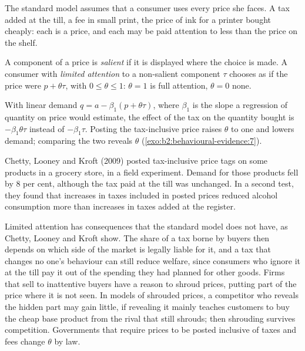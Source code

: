 The standard model assumes that a consumer uses every price she faces. A tax added at the till, a fee
in small print, the price of ink for a printer bought cheaply: each is a price, and each may be paid
attention to less than the price on the shelf.

\begin{definition}[Salience]\label{def:b2:behavioural-evidence:salience}
A component of a price is \emph{salient} if it is displayed where the choice is made.
A consumer with \emph{limited attention} to a non-salient component $\tau$ chooses as if the price were
$p + \theta\tau$, with $0 \le \theta \le 1$: $\theta = 1$ is full attention, $\theta = 0$ none.
\end{definition}

With linear demand $q = a - \beta_1(p + \theta\tau)$, where $\beta_1$ is the slope a regression of
quantity on price would estimate, the effect of the tax on the quantity bought is
$-\beta_1\theta\tau$ instead of $-\beta_1\tau$. Posting the tax-inclusive price raises $\theta$ to one
and lowers demand; comparing the two reveals $\theta$ (\cref{exo:b2:behavioural-evidence:7}).

\begin{record}
Chetty, Looney and Kroft (2009) posted tax-inclusive price tags on some products in a grocery store, in
a field experiment. Demand for those products fell by 8 per cent, although the tax paid at the till
was unchanged. In a second test, they found that increases in taxes included in posted prices reduced
alcohol consumption more than increases in taxes added at the register.
\end{record}

Limited attention has consequences that the standard model does not have, as Chetty, Looney and Kroft
show. The share of a tax borne by buyers then depends on which side of the market is legally liable for it, and a tax that changes no one's
behaviour can still reduce welfare, since consumers who ignore it at the till pay it out of the
spending they had planned for other goods. Firms that sell to inattentive buyers have a reason to
shroud prices, putting part of the price where it is not seen. In models of shrouded prices, a
competitor who reveals the hidden part may gain little, if revealing it mainly teaches customers to buy
the cheap base product from the rival that still shrouds; then shrouding survives competition. Governments that require prices to be posted inclusive of taxes and fees change $\theta$ by
law.

